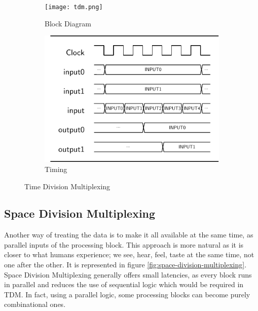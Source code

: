 \begin{figure}
    \begin{subfigure}[c]{.5\textwidth}
        \centering
        \texttt{[image: tdm.png]}
        \caption{Block Diagram}
    \end{subfigure}
    \begin{subfigure}[c]{.5\textwidth}
        \centering
        \includegraphics[width=1\linewidth]{../timings/tdm.pdf}
        \caption{Timing}
    \end{subfigure}
    \caption{Time Division Multiplexing}
    \label{fig:time-division-multiplexing}
\end{figure}

\subsection{Space Division Multiplexing}
Another way of treating the data is to make it all available at the same time, as parallel inputs of the processing block. This approach is more natural as it is closer to what humans experience; we see, hear, feel, taste at the same time, not one after the other. It is represented in figure \ref{fig:space-division-multiplexing}. Space Division Multiplexing generally offers small latencies, as every block runs in parallel and reduces the use of sequential logic which would be required in TDM. In fact, using a parallel logic, some processing blocks can become purely combinational ones.

